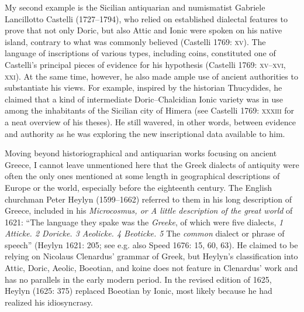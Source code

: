 \documentclass[12pt]{article}
\newenvironment{styleStandard}{\renewcommand\baselinestretch{1.25}\setlength\leftskip{0in}\setlength\rightskip{0in}\setlength\parindent{0.1972in}\setlength\parfillskip{0pt plus 1fil}\setlength\parskip{0in plus 1pt}\writerlistparindent\writerlistleftskip\leavevmode\normalfont\normalsize\writerlistlabel\ignorespaces}{\unskip\vspace{0in plus 1pt}\par}
\newcommand\writerlistleftskip{}
\newcommand\writerlistparindent{}
\newcommand\writerlistlabel{}
\begin{document}
\begin{styleStandard}
My second example is the Sicilian antiquarian and numismatist Gabriele Lancillotto Castelli (1727–1794), who relied on established dialectal features to prove that not only Doric, but also Attic and Ionic were spoken on his native island, contrary to what was commonly believed (Castelli 1769: \textsc{xv}). The language of inscriptions of various types, including coins, constituted one of Castelli’s principal pieces of evidence for his hypothesis (Castelli 1769: \textsc{xv–xvi, xxi}). At the same time, however, he also made ample use of ancient authorities to substantiate his views. For example, inspired by the historian Thucydides, he claimed that a kind of intermediate Doric–Chalcidian Ionic variety was in use among the inhabitants of the Sicilian city of Himera (see Castelli 1769: \textsc{xxxiii} for a neat overview of his theses). He still wavered, in other words, between evidence and authority as he was exploring the new inscriptional data available to him.
\end{styleStandard}

\begin{styleStandard}
Moving beyond historiographical and antiquarian works focusing on ancient Greece, I cannot leave unmentioned here that the Greek dialects of antiquity were often the only ones mentioned at some length in geographical descriptions of Europe or the world, especially before the eighteenth century. The English churchman Peter Heylyn (1599–1662) referred to them in his long description of Greece, included in his \textit{Microcosmus, or A little description of the great world} of 1621: “The language they spake was the \textit{Greeke}, of which were five dialects, \textit{1 Atticke. 2 Doricke. 3 Aeolicke. 4 Beoticke. 5} The \textit{common} dialect or phrase of speech” (Heylyn 1621: 205; see e.g. also Speed 1676: 15, 60, 63). He claimed to be relying on Nicolaus Clenardus’ grammar of Greek, but Heylyn’s classification into Attic, Doric, Aeolic, Boeotian, and koine does not feature in Clenardus’ work and has no parallels in the early modern period. In the revised edition of 1625, Heylyn (1625: 375) replaced Boeotian by Ionic, most likely because he had realized his idiosyncrasy.
\end{styleStandard}
\end{document}
